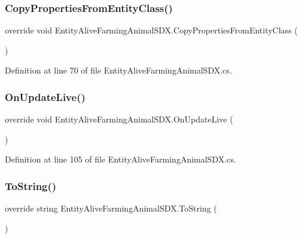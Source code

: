 \subsubsection{\texorpdfstring{CopyPropertiesFromEntityClass()}{CopyPropertiesFromEntityClass()}}
{\footnotesize\ttfamily override void Entity\+Alive\+Farming\+Animal\+S\+D\+X.\+Copy\+Properties\+From\+Entity\+Class (\begin{DoxyParamCaption}{ }\end{DoxyParamCaption})}



Definition at line 70 of file Entity\+Alive\+Farming\+Animal\+S\+D\+X.\+cs.

\mbox{\label{class_entity_alive_farming_animal_s_d_x_a7beb1631a7f2d5b3e5a9967a4a2fcc55}} 
\subsubsection{\texorpdfstring{OnUpdateLive()}{OnUpdateLive()}}
{\footnotesize\ttfamily override void Entity\+Alive\+Farming\+Animal\+S\+D\+X.\+On\+Update\+Live (\begin{DoxyParamCaption}{ }\end{DoxyParamCaption})}



Definition at line 105 of file Entity\+Alive\+Farming\+Animal\+S\+D\+X.\+cs.

\mbox{\label{class_entity_alive_farming_animal_s_d_x_a0c73747ffe4df09009bd0b91c6262dab}} 
\subsubsection{\texorpdfstring{ToString()}{ToString()}}
{\footnotesize\ttfamily override string Entity\+Alive\+Farming\+Animal\+S\+D\+X.\+To\+String (\begin{DoxyParamCaption}{ }\end{DoxyParamCaption})}



